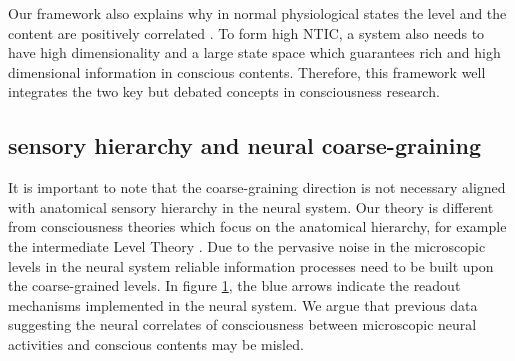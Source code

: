 \documentclass[utf8]{article}
\begin{document}
	    Our framework also explains why in normal physiological states the level and the content are positively correlated \citep{laureys2005neural}\needfig{}. To form high NTIC, a system also needs to have high dimensionality and a large state space which guarantees rich and high dimensional information in conscious contents. Therefore, this framework well integrates the two key but debated concepts in consciousness research. 
			
			
		\subsection{sensory hierarchy and neural coarse-graining}\label{sec:SensoryHierarchy}

        It is important to note that the coarse-graining direction is not necessary aligned with  anatomical sensory hierarchy in the neural system. Our theory is different from consciousness theories which focus on the anatomical hierarchy, for example the intermediate Level Theory \citep[see also \ref{IntermediateLevelTheory}]{prinz2007intermediate, jackendoff1987consciousness}. Due to the pervasive noise in the microscopic levels in the neural system reliable information processes need to be built upon the coarse-grained levels. In figure \ref{fig:hierarchy}, the blue arrows indicate the readout mechanisms implemented in the neural system. We argue that previous data suggesting the neural correlates of consciousness between microscopic neural activities and conscious contents may be misled. 

        
		\begin{figure}[H]
		
			\label{fig:hierarchy}
		\end{figure}


\end{document}
